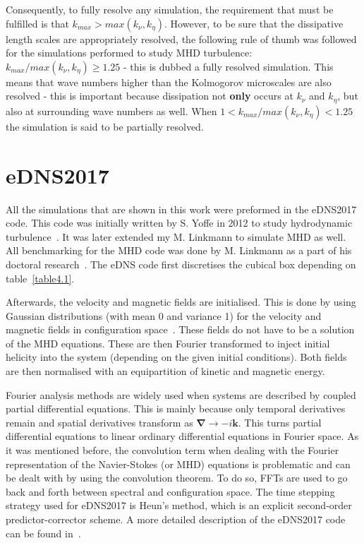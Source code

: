 \documentclass[12pt,a4paper]{report}
\begin{document}
Consequently, to fully resolve any simulation, the requirement that must be fulfilled is that $k_{max} > max(k_\nu, k_\eta)$. However, to be sure that the dissipative length scales are appropriately resolved, the following rule of thumb was followed for the simulations performed to study MHD turbulence: ${k_{max}/max(k_\nu, k_\eta)\geq1.25}$ - this is dubbed a fully resolved simulation. This means that wave numbers higher than the Kolmogorov microscales are also resolved - this is important because dissipation not \textbf{only} occurs at $k_\nu$ and $k_\eta$, but also at surrounding wave numbers as well. When $1<{k_{max}/max(k_\nu, k_\eta)<1.25}$ the simulation is said to be partially resolved. 

\section{eDNS2017}

All the simulations that are shown in this work were preformed in the eDNS2017 code. This code was initially written by S. Yoffe in 2012 to study hydrodynamic turbulence~\cite{yoffe2013investigation}. It was later extended my M. Linkmann to simulate MHD as well. All benchmarking for the MHD code was done by M. Linkmann as a part of his doctoral research~\cite{LinkmannMoritzFrederikLeon2016Spim}. The eDNS code first discretises the cubical box depending on table~\ref{table4.1}.

Afterwards, the velocity and magnetic fields are initialised. This is done by using Gaussian distributions (with mean 0 and variance 1) for the velocity and magnetic fields in configuration space~\cite{yoffe2013investigation}. These fields do not have to be a solution of the MHD equations. These are then Fourier transformed to inject initial helicity into the system (depending on the given initial conditions). Both fields are then normalised with an equipartition of kinetic and magnetic energy. 

Fourier analysis methods are widely used when systems are described by coupled partial differential equations. This is mainly because only temporal derivatives remain and spatial derivatives transform as $\bm \nabla \rightarrow -i \bm k$. This turns partial differential equations to linear ordinary differential equations in Fourier space. As it was mentioned before, the convolution term when dealing with the Fourier representation of the Navier-Stokes (or MHD) equations is problematic and can be dealt with by using the convolution theorem. To do so, FFTs are used to go back and forth between spectral and configuration space. The time stepping strategy used for eDNS2017 is Heun's method, which is an explicit second-order predictor-corrector scheme. A more detailed description of the eDNS2017 code can be found in~\cite{LinkmannMoritzFrederikLeon2016Spim, yoffe2013investigation}.
\end{document}
